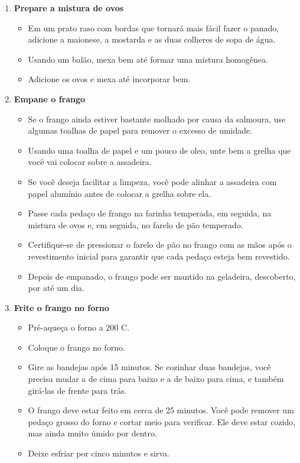 \documentclass [11pt, papel de carta] {article}
\begin{document}
\begin {description}
\begin {enumerate}
\item {\bf Prepare a mistura de ovos}
\begin {itemize}
\item Em um prato raso com bordas que tornará mais fácil fazer o panado, adicione a maionese, a mostarda e as duas colheres de sopa de água.
\item Usando um bal\~ao, mexa bem até formar uma mistura homogênea.
\item Adicione os ovos e mexa até incorporar bem.
\end {itemize}
\item {\bf Empane o frango}
\begin {itemize}
\item Se o frango ainda estiver bastante molhado por causa da salmoura, use algumas toalhas de papel para remover o excesso de umidade.
\item Usando uma toalha de papel e um pouco de oleo, unte bem a grelha que você vai colocar sobre a assadeira.
\item Se você deseja facilitar a limpeza, você pode alinhar a assadeira com papel alumínio antes de colocar a grelha sobre ela.
\item Passe cada pedaço de frango na farinha temperada, em seguida, na mistura de ovos e, em seguida, no farelo de pão temperado.
\item Certifique-se de pressionar o farelo de pão no frango com as mãos após o revestimento inicial para garantir que cada pedaço esteja bem revestido.
\item Depois de empanado, o frango pode ser mantido na geladeira, descoberto, por até um dia.
\end {itemize}
\item {\bf Frite o frango no forno}
\begin {itemize}
\item Pré-aqueça o forno a 200 C.
\item Coloque o frango no forno.
\item Gire as bandejas após 15 minutos. Se cozinhar duas bandejas, você precisa mudar a de cima para baixo e a de baixo para cima, e também girá-las de frente para tr\'as.
\item O frango deve estar feito em cerca de 25 minutos. Você pode remover um pedaço grosso do forno e cortar meio para verificar. Ele deve estar cozido, mas ainda muito úmido por dentro.
\item Deixe esfriar por cinco minutos e sirva.
\end {itemize}
      \end {enumerate}
\end {description}
\end{document}
